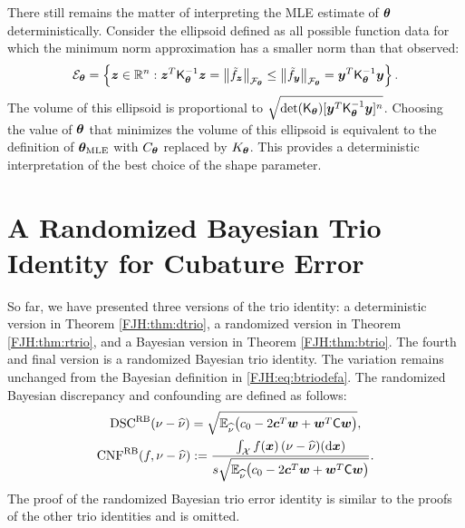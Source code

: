 \documentclass[graybox,footinfo]{svmult}
\begin{document}
There still remains the matter of interpreting the MLE estimate of ${\boldsymbol{\theta}}$ 
deterministically.  Consider the ellipsoid defined as all possible function data for 
which the minimum norm approximation has a smaller norm than that observed:
\[
{\mathcal{E}}_{\boldsymbol{\theta}} = \left\{ {\boldsymbol{z}} \in {\mathbb{R}}^n :  {\boldsymbol{z}}^T 
\mathsf{K}_{\boldsymbol{\theta}}^{-1} {\boldsymbol{z}} = \left \lVert \tilde{f}_{\boldsymbol{z}} \right \rVert_{{\mathcal{F}}_{\boldsymbol{\theta}}} \le 
\left \lVert \tilde{f}_{\boldsymbol{y}} \right \rVert_{{\mathcal{F}}_{\boldsymbol{\theta}}} =  {\boldsymbol{y}}^T 
\mathsf{K}_{\boldsymbol{\theta}}^{-1} {\boldsymbol{y}} \right\}.
\]
The volume of this ellipsoid is proportional to $\sqrt{\det(\mathsf{K}_{\boldsymbol{\theta}}) [ {\boldsymbol{y}}^T 
	\mathsf{K}_{\boldsymbol{\theta}}^{-1} {\boldsymbol{y}}]^n}$.  Choosing the value of ${\boldsymbol{\theta}}$ that minimizes 
	the volume of this ellipsoid is equivalent to the definition of ${\boldsymbol{\theta}}_{\text{MLE}}$ with 
	$C_{\boldsymbol{\theta}}$ replaced by $K_{\boldsymbol{\theta}}$.  This provides a deterministic interpretation of 
	the best choice of the shape parameter.
	
\begin{FJHLesson}
	\FJHLessonNine
\end{FJHLesson}

\section{A Randomized Bayesian Trio Identity for Cubature Error}

So far, we have presented three versions of the trio identity: a deterministic version  in 
Theorem \ref{FJH:thm:dtrio}, a randomized version in Theorem \ref{FJH:thm:rtrio}, and a 
Bayesian 
version in Theorem \ref{FJH:thm:btrio}.  The fourth and final version is a randomized 
Bayesian trio identity.  The variation remains unchanged from the Bayesian definition in 
\eqref{FJH:eq:btriodefa}.  
The randomized Bayesian discrepancy and confounding are defined as follows:
\begin{subequations} \label{FJH:eq:rbtriodef}
	\begin{gather}
	\label{FJH:eq:bbtriodefa}
\disc^{\Rn\Ba}(\nu - \hnu) = \sqrt{\bbE_{\hnu}  \bigl(c_0 - 
		2 \bsc^T \bsw + \bsw ^T \mC \bsw \bigr)},\\
	\algn^{\Rn\Ba}(f,\nu - \hnu) :=\frac{ \int_{\calX} 
		f(\bsx) \, (\nu - \hnu)(\D\bsx)}{s  \sqrt{\bbE_{\hnu}  \bigl(c_0 - 
			2 \bsc^T \bsw + \bsw ^T \mC \bsw \bigr)}}.
	\end{gather}
\end{subequations}
The proof of the randomized Bayesian trio error identity is similar to the proofs of the 
other trio identities and is omitted.
\end{document}
